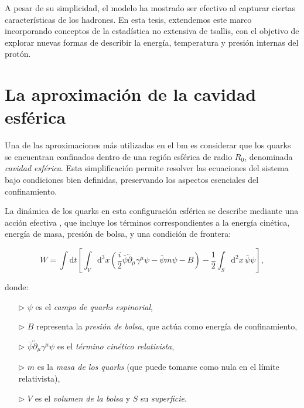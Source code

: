 A pesar de su simplicidad, el modelo ha mostrado ser efectivo al capturar ciertas características de los hadrones. En esta tesis, extendemos este marco incorporando conceptos de la estadística no extensiva de \gls{tsallis}, con el objetivo de explorar nuevas formas de describir la energía, temperatura y presión internas del protón.

\section{La aproximación de la cavidad esférica}

Una de las aproximaciones más utilizadas en el \gls{bm} es considerar que los quarks se encuentran confinados dentro de una región esférica de radio $R_0$, denominada \emph{cavidad esférica}. Esta simplificación permite resolver las ecuaciones del sistema bajo condiciones bien definidas, preservando los aspectos esenciales del confinamiento.

La dinámica de los quarks en esta configuración esférica se describe mediante una acción efectiva \cite{Chodos_1974}, que incluye los términos correspondientes a la energía cinética, energía de masa, presión de bolsa, y una condición de frontera:

\begin{equation} \label{eq:bag-action}
W = \int \! \mathrm{d}t \left[ \int_V \! \mathrm{d}^3x \left( \frac{i}{2} \bar{\psi} \overleftrightarrow{\partial}_{\mu} \gamma^\mu \psi - \bar{\psi} m \psi - B \right) - \frac{1}{2} \int_S \! \mathrm{d}^2x \, \bar{\psi} \psi \right],
\end{equation}

donde:
\begin{enumerate}
    \item[$\triangleright$] $\psi$ es el \emph{campo de quarks espinorial},
    \item[$\triangleright$] $B$ representa la \emph{presión de bolsa}, que actúa como energía de confinamiento,
    \item[$\triangleright$] $\bar{\psi} \overleftrightarrow{\partial}_{\mu} \gamma^\mu \psi$ es el \emph{término cinético relativista},
    \item[$\triangleright$] $m$ es la \emph{masa de los quarks} (que puede tomarse como nula en el límite relativista),
    \item[$\triangleright$] $V$ es el \emph{volumen de la bolsa} y $S$ su \emph{superficie}.
\end{enumerate}

